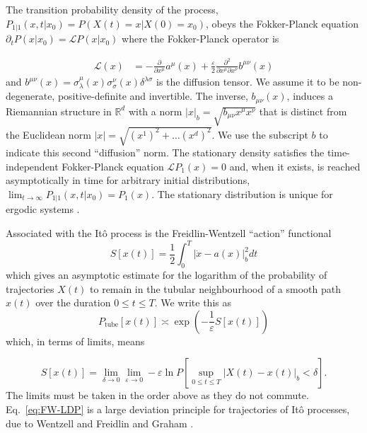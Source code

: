 The transition probability density
of the process, $P_{1|1}(x,t|x_{0})=P(X(t)=x|X(0)=x_{0})$, obeys
the Fokker-Planck equation $\partial_{t}P(x|x_{0})=\mathcal{L}P(x|x_{0})$
where the Fokker-Planck operator is

\emph{
\begin{equation}
\begin{aligned}\mathcal{L}(x) & =-\frac{\partial}{\partial x^{\mu}}a^{\mu}(x)+\frac{\varepsilon}{2}\frac{\partial^{2}}{\partial x^{\mu}\partial x^{\nu}}b^{\mu\nu}(x)\end{aligned}
\label{eq:fokker-planck}
\end{equation}
}and \textbf{$b^{\mu\nu}(x)=\sigma_{\lambda}^{\mu}(x)\sigma_{\sigma}^{\nu}(x)\delta^{\lambda\sigma}$}
is the diffusion tensor. We assume it to be non-degenerate, positive-definite
and invertible. The inverse, $b_{\mu\nu}(x)$, induces a Riemannian
structure in $\mathbb{R}^{d}$ with a norm $|x|_{b}=\sqrt{b_{\mu\nu}x^{\mu}x^{\nu}}$
that is distinct from the Euclidean norm $|x|=\sqrt{(x^{1})^{2}+\ldots(x^{d})^{2}}.$
We use the subscript $b$ to indicate this second ``diffusion''
norm. The stationary density satisfies the time-independent Fokker-Planck
equation\emph{ }$\mathcal{L}P_{1}(x)=0$ and, when it exists, is reached
asymptotically in time for arbitrary initial distributions, $\lim_{t\rightarrow\infty}P_{1|1}(x,t|x_{0})=P_{1}(x)$.
The stationary distribution is unique for ergodic
systems \citep{pavliotis2014stochastic}. 

Associated with the Itô process is the Freidlin-Wentzell ``action''
functional \citep{ventsel1970small,graham1973statistical,graham1987macroscopic}
\begin{equation}
S[x(t)]=\frac{1}{2}\int_{0}^{T}|\dot{x}-a(x)|_{b}^{2}dt\label{eq:Freidlin-Wentzell action}
\end{equation}
which gives an asymptotic estimate for the logarithm of the probability
of trajectories $X(t)$ to remain in the tubular neighbourhood of
a smooth path $x(t)$ over the duration $0\le t\leq T$. We write
this as
\begin{equation}
P_{\text{tube}}[x(t)]\asymp\exp\left(-\frac{1}{\varepsilon}S[x(t)]\right)\label{eq:FW-LDP}
\end{equation}
which, in terms of limits, means

\[
S[x(t)]=\lim_{\delta\to0}\lim_{\varepsilon\to0}-\varepsilon\ln P\left[\sup_{0\leq t\leq T}|X(t)-x(t)|_{b}<\delta\right].
\]
The limits must be taken in the order above as they do not commute.
Eq.~\ref{eq:FW-LDP} is a large deviation principle for trajectories
of Itô processes, due to Wentzell and Freidlin and Graham \citep{touchette2009large}.

